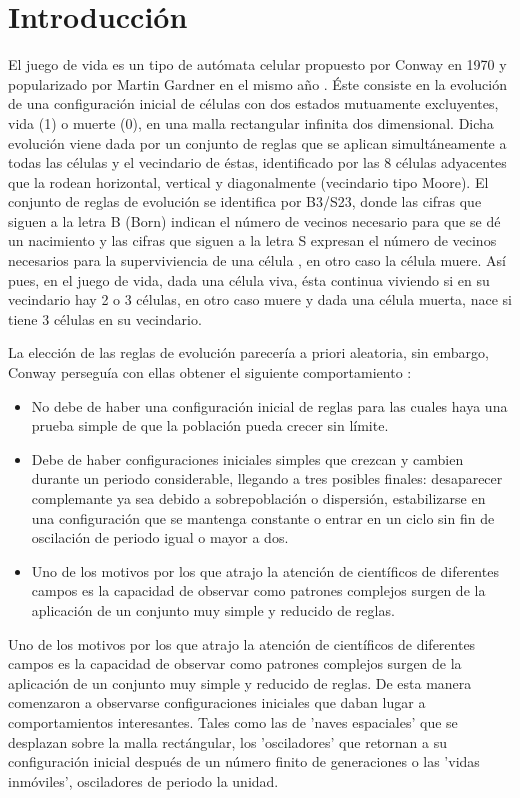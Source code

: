 \documentclass[../proyecto.tex]{book}
\begin{document}
\chapter{Introducción}


El juego de vida es un tipo de autómata celular propuesto por Conway en 1970 y popularizado por Martin Gardner en el mismo año \cite{primerap}. Éste consiste en la evolución de una configuración inicial de células con dos estados mutuamente excluyentes, vida (1) o muerte (0), en una malla rectangular infinita dos dimensional. Dicha evolución viene dada por un conjunto de reglas que se aplican simultáneamente a todas las células y el vecindario de éstas, identificado por las 8 células adyacentes que la rodean horizontal, vertical y diagonalmente (vecindario tipo Moore). El conjunto de reglas de evolución se identifica por B3/S23, donde las cifras que siguen a la letra B (Born) indican el número de vecinos necesario para que se dé un nacimiento y las cifras que siguen a la letra S expresan el número de vecinos necesarios para la superviviencia de una célula , en otro caso la célula muere. Así pues, en el juego de vida, dada una célula viva, ésta continua viviendo si en su vecindario hay 2 o 3 células, en otro caso muere y dada una célula muerta, nace si tiene 3 células en su vecindario.

La elección de las reglas de evolución parecería a priori aleatoria, sin embargo, Conway perseguía con ellas obtener el siguiente comportamiento \cite{libroGardner}:
\begin{itemize}
	\item No debe de haber una configuración inicial de reglas para las cuales haya una prueba simple de que la población pueda crecer sin límite.

	\item Debe de haber configuraciones iniciales simples que crezcan y cambien durante un periodo considerable, llegando a tres posibles finales: desaparecer complemante ya sea debido a sobrepoblación o dispersión, estabilizarse en una configuración que se mantenga constante o entrar en un ciclo sin fin de oscilación de periodo igual o mayor a dos.  
	\item Uno de los motivos por los que atrajo la atención de científicos de diferentes campos es la capacidad de observar como patrones complejos surgen de la aplicación de un conjunto muy simple y reducido de reglas. 
\end{itemize}

Uno de los motivos por los que atrajo la atención de científicos de diferentes campos es la capacidad de observar como patrones complejos surgen de la aplicación de un conjunto muy simple y reducido de reglas. De esta manera comenzaron a observarse configuraciones iniciales que daban lugar a comportamientos interesantes. Tales como las de 'naves espaciales' que se desplazan sobre la malla rectángular, los 'osciladores' que retornan a su configuración inicial después de un número finito de generaciones o las 'vidas inmóviles', osciladores de periodo la unidad.
\end{document}
